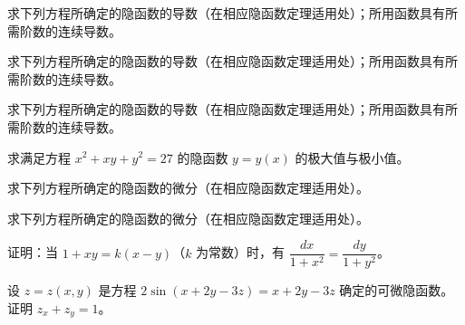 \newpage
\noindent\begin{minipage}{\textwidth}
求下列方程所确定的隐函数的导数（在相应隐函数定理适用处）；所用函数具有所需阶数的连续导数。
\end{minipage}\par\vfill
\noindent\begin{minipage}{\textwidth}
求下列方程所确定的隐函数的导数（在相应隐函数定理适用处）；所用函数具有所需阶数的连续导数。
\end{minipage}\par\vfill
\noindent\begin{minipage}{\textwidth}
求下列方程所确定的隐函数的导数（在相应隐函数定理适用处）；所用函数具有所需阶数的连续导数。
\end{minipage}\par\vfill
\noindent\begin{minipage}{\textwidth}
求满足方程 $x^2+xy+y^2=27$ 的隐函数 $y=y(x)$ 的极大值与极小值。
\end{minipage}\par\vfill
\newpage
\noindent\begin{minipage}{\textwidth}
求下列方程所确定的隐函数的微分（在相应隐函数定理适用处）。
\end{minipage}\par\vfill
\noindent\begin{minipage}{\textwidth}
求下列方程所确定的隐函数的微分（在相应隐函数定理适用处）。
\end{minipage}\par\vfill
\noindent\begin{minipage}{\textwidth}
证明：当 $1+xy=k(x-y)$（$k$ 为常数）时，有 $\dfrac{dx}{1+x^2}=\dfrac{dy}{1+y^2}$。
\end{minipage}\par\vfill
\noindent\begin{minipage}{\textwidth}
设 $z=z(x,y)$ 是方程 $2\sin(x+2y-3z)=x+2y-3z$ 确定的可微隐函数。证明 $z_x+z_y=1$。
\end{minipage}\par\vfill
